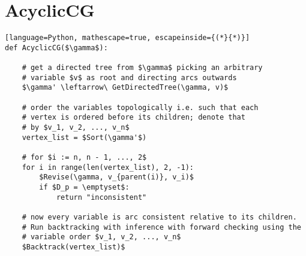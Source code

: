 \documentclass{article}
\begin{document}
\section*{AcyclicCG}
\begin{lstlisting}[language=Python, mathescape=true, escapeinside={(*}{*)}]
def AcyclicCG($\gamma$):

    # get a directed tree from $\gamma$ picking an arbitrary
    # variable $v$ as root and directing arcs outwards
    $\gamma' \leftarrow\ GetDirectedTree(\gamma, v)$

    # order the variables topologically i.e. such that each
    # vertex is ordered before its children; denote that 
    # by $v_1, v_2, ..., v_n$
    vertex_list = $Sort(\gamma'$)

    # for $i := n, n - 1, ..., 2$
    for i in range(len(vertex_list), 2, -1):
        $Revise(\gamma, v_{parent(i)}, v_i)$
        if $D_p = \emptyset$:
            return "inconsistent"

    # now every variable is arc consistent relative to its children.
    # Run backtracking with inference with forward checking using the 
    # variable order $v_1, v_2, ..., v_n$
    $Backtrack(vertex_list)$

\end{lstlisting}
\end{document}
